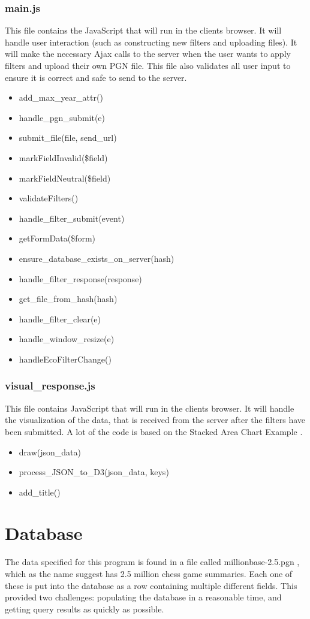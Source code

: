 \documentclass{article}
\begin{document}
\subsubsection{main.js}
This file contains the JavaScript that will run in the clients browser. It
will handle user interaction (such as constructing new filters and uploading
files). It will make the necessary Ajax calls to the server when the user
wants to apply filters and upload their own PGN file. This file also
validates all user input to ensure it is correct and safe to send to the server.
\begin{itemize}
	\item add\_max\_year\_attr()
	\item handle\_pgn\_submit(e)
	\item submit\_file(file, send\_url)
	\item markFieldInvalid(\$field)
	\item markFieldNeutral(\$field)
	\item validateFilters()
	\item handle\_filter\_submit(event)
	\item getFormData(\$form)
	\item ensure\_database\_exists\_on\_server(hash)
	\item handle\_filter\_response(response)
	\item get\_file\_from\_hash(hash)
	\item handle\_filter\_clear(e)
	\item handle\_window\_resize(e)
	\item handleEcoFilterChange()
\end{itemize}

\subsubsection{visual\_response.js}
This file contains JavaScript that will run in the clients browser. It
will handle the visualization of the data, that is received from the server
after
the filters have been submitted. A lot of the code is based on the Stacked Area
Chart Example \cite{chart}.
\begin{itemize}
	\item draw(json\_data)
	\item process\_JSON\_to\_D3(json\_data, keys)
	\item add\_title()
\end{itemize}

\section{Database}
The data specified for this program is found in a file called
millionbase-2.5.pgn \cite{def_db}, which as the name suggest has 2.5 million
chess game summaries. Each one of these is put into the database as a row
containing multiple different fields.  This provided two challenges:
populating the database in a reasonable time, and getting query results as
quickly as possible.
\end{document}
